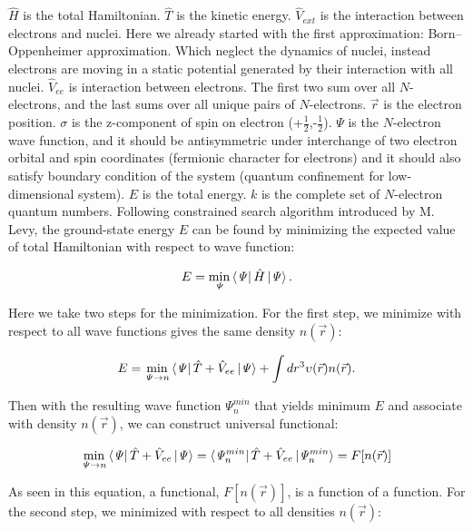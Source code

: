 $\hat{H}$ is the total Hamiltonian. $\hat{T}$ is the kinetic energy. $\hat{V}_{ext}$ is the interaction between electrons and nuclei. Here we already started with the first approximation: Born–Oppenheimer approximation\cite{Born1927}. Which neglect the dynamics of nuclei, instead electrons are moving in a static potential generated by their interaction with all nuclei. $\hat{V}_{ee}$ is interaction between electrons. The first two sum over all $N$-electrons, and the last sums over all unique pairs of $N$-electrons. $\vec{r}$ is the electron position. $\sigma$ is the z-component of spin on electron (+$\frac{1}{2}$,-$\frac{1}{2}$). $\mathit{\Psi}$ is the $N$-electron wave function, and it should be antisymmetric under interchange of two electron orbital and spin coordinates (fermionic character for electrons) and it should also satisfy boundary condition of the system (quantum confinement for low-dimensional system). $E$ is the total energy. $k$ is the complete set of $N$-electron quantum numbers. Following constrained search algorithm introduced by M. Levy\cite{Levy1979}, the ground-state energy $E$ can be found by minimizing the expected value of total Hamiltonian with respect to wave function:

\begin{equation}
E=\min_\mathit{\Psi}\bra{\mathit{\Psi}}\hat{H}\ket{\mathit{\Psi}}.
\end{equation}

Here we take two steps for the minimization. For the first step, we minimize with respect to all wave functions gives the same density $n(\vec{r})$:

\begin{equation}
E=\min_{\mathit{\Psi}\rightarrow n}\bra{\mathit{\Psi}}\hat{T}+\hat{V}_{ee}\ket{\mathit{\Psi}}+\int dr^3\upsilon(\vec{r})n(\vec{r}).
\end{equation}

Then with the resulting wave function $\mathit{\Psi}^{min}_n$ that yields minimum $E$ and associate with density $n(\vec{r})$, we can construct universal functional:

\begin{equation}
\min_{\mathit{\Psi}\rightarrow n}\bra{\mathit{\Psi}}\hat{T}+\hat{V}_{ee}\ket{\mathit{\Psi}}=\bra{\mathit{\Psi}^{min}_n}\hat{T}+\hat{V}_{ee}\ket{\mathit{\Psi}^{min}_n}=F[n(\vec{r})]
\end{equation}

As seen in this equation, a functional, $F[n(\vec{r})]$, is a function of a function. For the second step, we minimized with respect to all densities $n(\vec{r})$:

